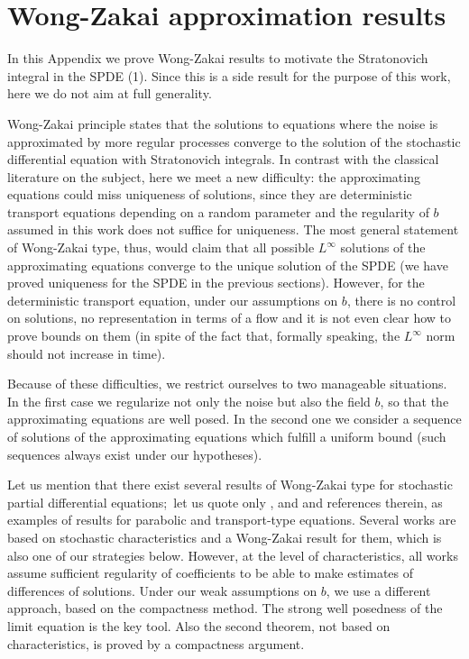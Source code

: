\documentclass[a4paper,11pt]{article}
\begin{document}

\section{Wong-Zakai approximation results}

\label{sec:wk} In this Appendix we prove Wong-Zakai results to motivate the
Stratonovich integral in the SPDE (1). Since this is a side result for the
purpose of this work, here we do not aim at full generality.

Wong-Zakai principle states that the solutions to equations where the noise
is approximated by more regular processes converge to the solution of the
stochastic differential equation with Stratonovich integrals. In contrast
with the classical literature on the subject, here we meet a new difficulty:
the approximating equations could miss uniqueness of solutions, since they
are deterministic transport equations depending on a random parameter and
the regularity of $b$ assumed in this work does not suffice for uniqueness.
The most general statement of Wong-Zakai type, thus, would claim that all
possible $L^{\infty}$ solutions of the approximating equations converge to
the unique solution of the SPDE (we have proved uniqueness for the SPDE in
the previous sections). However, for the deterministic transport equation,
under our assumptions on $b$, there is no control on solutions, no
representation in terms of a flow and it is not even clear how to prove bounds
on them (in spite of the fact that, formally speaking, the $L^{\infty}$ norm
should not increase in time).

Because of these difficulties, we restrict ourselves to two manageable
situations. In the first case we regularize not only the noise but also the
field $b$, so that the approximating equations are well posed. In the second
one we consider a sequence of solutions of the approximating equations which
fulfill a uniform bound (such sequences always exist under our hypotheses).

Let us mention that there exist several results of Wong-Zakai type for
stochastic partial differential equations;\ let us quote only \cite{GS},
\cite{TZ} and \cite{BF} and references therein, as examples of results for
parabolic and transport-type equations. Several works are based on
stochastic characteristics and a Wong-Zakai result for them, which is also
one of our strategies below. However, at the level of characteristics, all
works assume sufficient regularity of coefficients to be able to make
estimates of differences of solutions. Under our weak assumptions on $b$, we
use a different approach, based on the compactness method. The strong well
posedness of the limit equation is the key tool. Also the second theorem,
not based on characteristics, is proved by a compactness argument.
\end{document}
